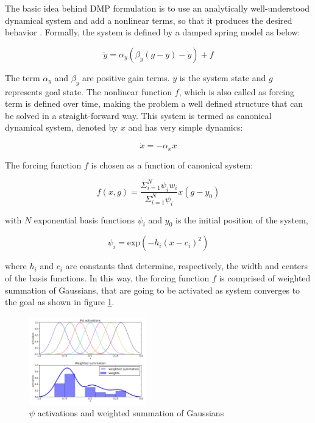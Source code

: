 \documentclass[sigconf]{acmart}
\begin{document}
The basic idea behind DMP formulation is to use an analytically well-understood dynamical system and add a nonlinear terms, so that it produces the desired behavior \cite{ijspeert2013dynamical}. Formally, the system is defined by a damped spring model as below:

\begin{equation}
	\ddot{y} = \alpha_y ( \beta_y (g - y) - \dot{y}) + f
\end{equation}

The term $\alpha_y$ and $\beta_y$ are positive gain terms. $y$ is the system state and $g$ represents goal state. The nonlinear function $f$, which is also called as forcing term is defined over time, making the problem a well defined structure that can be solved in a straight-forward way. This system is termed as canonical dynamical system, denoted by $x$ and has very simple dynamics:

\begin{equation}
	\dot{x} = -\alpha_x x
\end{equation}

The forcing function $f$ is chosen as a function of canonical system:

\begin{equation}
	f(x,g) = \frac{\Sigma_{i=1}^N \psi_i w_i}{\Sigma_{i=1}^N \psi_i} x(g - y_0)
	\label{forcing_func}
\end{equation}

with $N$ exponential basis functions $\psi_i$ and $y_0$ is the initial position of the system,

\begin{equation}
	\psi_i = \textrm{exp}\left( -h_i \left( x - c_i\right)^2 \right)
\end{equation}

where $h_i$ and $c_i$ are constants that determine, respectively, the width and centers of the basis functions. In this way, the forcing function $f$ is comprised of weighted summation of Gaussians, that are going to be activated as system converges to the goal as shown in figure \ref{psi_activations}.

\begin{figure}
	\includegraphics[width=0.45\textwidth]{psi}
	\caption{$\psi$ activations and weighted summation of Gaussians}
	\label{psi_activations}
\end{figure}
\end{document}
